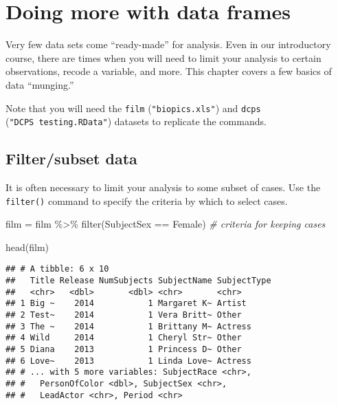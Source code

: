 \documentclass[
  12pt,
]{krantz}
\newenvironment{Shaded}{\begin{snugshade}}{\end{snugshade}}
\newcommand{\CommentTok}[1]{\textcolor[rgb]{0.56,0.35,0.01}{\textit{#1}}}
\newcommand{\FunctionTok}[1]{\textcolor[rgb]{0.00,0.00,0.00}{#1}}
\newcommand{\NormalTok}[1]{#1}
\newcommand{\OtherTok}[1]{\textcolor[rgb]{0.56,0.35,0.01}{#1}}
\newcommand{\SpecialCharTok}[1]{\textcolor[rgb]{0.00,0.00,0.00}{#1}}
\newcommand{\StringTok}[1]{\textcolor[rgb]{0.31,0.60,0.02}{#1}}
\begin{document}
\hypertarget{doing-more-with-data-frames}{%
\chapter{Doing more with data frames}\label{doing-more-with-data-frames}}

Very few data sets come ``ready-made'' for analysis. Even in our introductory course, there are times when you will need to limit your analysis to certain observations, recode a variable, and more. This chapter covers a few basics of data ``munging.''

Note that you will need the \texttt{film} (\texttt{"biopics.xls"}) and \texttt{dcps} (\texttt{"DCPS\ testing.RData"}) datasets to replicate the commands.

\hypertarget{filtersubset-data}{%
\section{Filter/subset data}\label{filtersubset-data}}

It is often necessary to limit your analysis to some subset of cases. Use the \texttt{filter()} command to specify the criteria by which to select cases.

\begin{Shaded}
\begin{Highlighting}[]
\NormalTok{  film }\OtherTok{=}
\NormalTok{    film }\SpecialCharTok{\%\textgreater{}\%}
    \FunctionTok{filter}\NormalTok{(SubjectSex }\SpecialCharTok{==} \StringTok{\textquotesingle{}Female\textquotesingle{}}\NormalTok{) }\CommentTok{\# criteria for keeping cases}

  \FunctionTok{head}\NormalTok{(film)}
\end{Highlighting}
\end{Shaded}

\begin{verbatim}
## # A tibble: 6 x 10
##   Title Release NumSubjects SubjectName SubjectType
##   <chr>   <dbl>       <dbl> <chr>       <chr>      
## 1 Big ~    2014           1 Margaret K~ Artist     
## 2 Test~    2014           1 Vera Britt~ Other      
## 3 The ~    2014           1 Brittany M~ Actress    
## 4 Wild     2014           1 Cheryl Str~ Other      
## 5 Diana    2013           1 Princess D~ Other      
## 6 Love~    2013           1 Linda Love~ Actress    
## # ... with 5 more variables: SubjectRace <chr>,
## #   PersonOfColor <dbl>, SubjectSex <chr>,
## #   LeadActor <chr>, Period <chr>
\end{verbatim}
\end{document}
